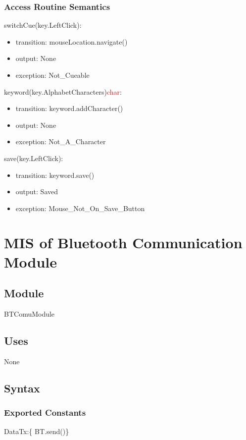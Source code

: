 \documentclass[12pt, titlepage]{article}
\begin{document}
\subsubsection{Access Routine Semantics}

\noindent switchCue(key.LeftClick):
\begin{itemize}
\item transition: mouseLocation.navigate() 
\item output: None
\item exception: Not\_Cueable 
\end{itemize}

\noindent keyword(key.AlphabetCharacters)\textcolor{red}{char}:
\begin{itemize}
\item transition: keyword.addCharacter()
\item output: None
\item exception: Not\_A\_Character 
\end{itemize}

\noindent save(key.LeftClick):
\begin{itemize}
\item transition: keyword.save() 
\item output: Saved
\item exception: Mouse\_Not\_On\_Save\_Button 
\end{itemize}

\newpage

\section{MIS of Bluetooth Communication Module} \label{BTComuModule} 


\subsection{Module}

BTComuModule

\subsection{Uses}

None

\subsection{Syntax}

\subsubsection{Exported Constants}
DataTx:\{ BT.send()\} 
\end{document}
